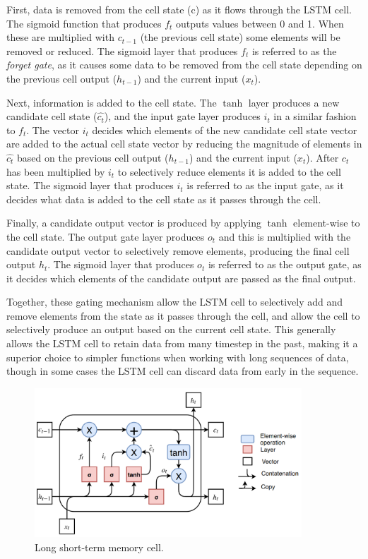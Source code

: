 \hfill \break

First, data is removed from the cell state (c) as it flows through the LSTM cell. The sigmoid function that produces $f_t$ outputs values between 0 and 1. When these are multiplied with $c_{t-1}$ (the previous cell state) some elements will be removed or reduced. The sigmoid layer that produces $f_t$ is referred to as the \textit{forget gate}, as it causes some data to be removed from the cell state depending on the previous cell output ($h_{t-1}$) and the current input ($x_t$).

\hfill \break

Next, information is added to the cell state. The $\tanh$ layer produces a new candidate cell state ($\hat{c_t}$), and the input gate layer produces $i_t$ in a similar fashion to $f_t$. The vector $i_t$ decides which elements of the new candidate cell state vector are added to the actual cell state vector by reducing the magnitude of elements in $\hat{c_t}$ based on the previous cell output ($h_{t-1}$) and the current input ($x_t$). After $\hat{c_t}$ has been multiplied by $i_t$ to selectively reduce elements it is added to the cell state. The sigmoid layer that produces $i_t$ is referred to as the input gate, as it decides what data is added to the cell state as it passes through the cell.

\hfill \break

Finally, a candidate output vector is produced by applying $\tanh$ element-wise to the cell state. The output gate layer produces $o_t$ and this is multiplied with the candidate output vector to selectively remove elements, producing the final cell output $h_t$. The sigmoid layer that produces $o_t$ is referred to as the output gate, as it decides which elements of the candidate output are passed as the final output.

\hfill \break

Together, these gating mechanism allow the LSTM cell to selectively add and remove elements from the state as it passes through the cell, and allow the cell to selectively produce an output based on the current cell state. This generally allows the LSTM cell to retain data from many timestep in the past, making it a superior choice to simpler functions when working with long sequences of data, though in some cases the LSTM cell can discard data from early in the sequence.


\begin{figure}[h]
    \centering
    \includegraphics[width=10cm]{cap3/long-short-term-memory-cell.png}
    \caption{Long short-term memory cell.}
    \label{fig:lstm_cell}
\end{figure}

